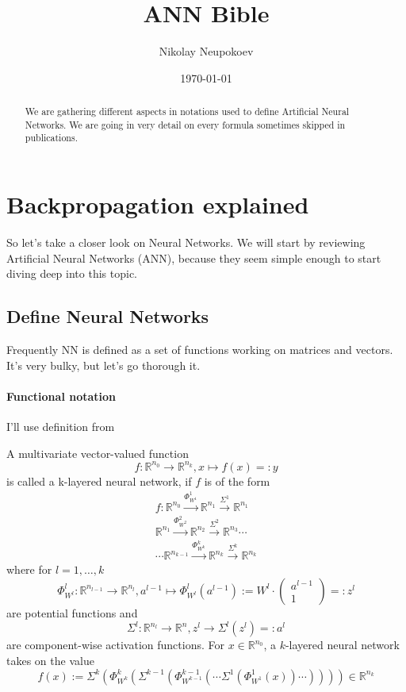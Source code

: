 \documentclass{article}
\title{ANN Bible}
\author{Nikolay Neupokoev}
\date{\today}
\def\RealSet{\mathbb{R}}
\begin{document}
\maketitle
\begin{abstract}
We are gathering different aspects in notations used to define Artificial Neural Networks. We are going in very detail on every formula sometimes skipped in publications.
\end{abstract}

\tableofcontents

\section{Backpropagation explained}


So let's take a closer look on Neural Networks. We will start by reviewing Artificial Neural Networks (ANN), because they seem simple enough to start diving deep into this topic.


\subsection{Define Neural Networks}

Frequently NN is defined as a set of functions working on matrices and vectors. It's very bulky, but let's go thorough it. 

\paragraph{Functional notation}
I'll use definition from \cite{Ostwald:2021}

A multivariate vector-valued function
\[
f \colon \RealSet^{n_0} \rightarrow \RealSet^{n_k}, x\mapsto f(x)=:y
\]
is called a k-layered neural network, if $f$ is of the form
\begin{multline}
f \colon \RealSet^{n_0} \xrightarrow{\Phi_{W^1}^1} \RealSet^{n_1}
\xrightarrow{\Sigma^1} \RealSet^{n_1} \\
\RealSet^{n_1} \xrightarrow{\Phi_{W^2}^2} \RealSet^{n_2}
\xrightarrow{\Sigma^2} \RealSet^{n_3} \cdots \\
\cdots \RealSet^{n_{k-1}}
\xrightarrow{\Phi_{W^k}^k} \RealSet^{n_k}
\xrightarrow{\Sigma^k} \RealSet^{n_k}
\end{multline}
where for $l=1,\ldots,k$
\begin{equation}\label{Phi}
\Phi_{W^l}^l \colon \RealSet^{n_{l-1}} \rightarrow \RealSet^{n_l}, 
a^{l-1}\mapsto \Phi_{W^l}^l(a^{l-1}) :=W^l \cdot \begin{pmatrix} a^{l-1} \\ 1 \end{pmatrix} =: z^l
\end{equation}
are potential functions and
\begin{equation}\label{Sigma}
\Sigma^l \colon \RealSet^{n_{l}} \rightarrow \RealSet^{n},
z^l \rightarrow \Sigma^l(z^l) =: a^l
\end{equation}
are component-wise activation functions. For $x\in \RealSet^{n_0}$, a $k$-layered neural network takes on the value
\[
f(x) := \Sigma^k( \Phi_{W^k}^k( \Sigma^{k-1}( \Phi_{W^{k-1}}^{k-1}(\cdots \Sigma^1( \Phi_{W^1}^1(x) ) \cdots) ) ) ) \in \RealSet^{n_k}
\]
\end{document}
